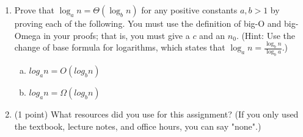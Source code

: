\documentclass[11pt]{article}
\begin{document}
\newpage


\begin{enumerate}

\item Prove that $\log_a n = \Theta(\log_b n)$ for any positive constants $a, b
> 1$ by proving each of the following. You must use the definition of big-O and
big-Omega in your proofs; that is, you must give a $c$ and an $n_0$. (Hint: Use the change of base formula for logarithms,
which states that $\log_a n = \frac{\log_b n}{\log_b a}$.)

    \begin{enumerate}[(a)]
        \item $log_a n = O(log_b n)$
        \item $log_a n = \Omega(log_b n)$
    \end{enumerate} 

    
    \item (1 point) What resources did you use for this assignment? (If you only used the textbook, lecture notes, and office hours, you can say "none".)
    \end{enumerate}
    
\end{document}

